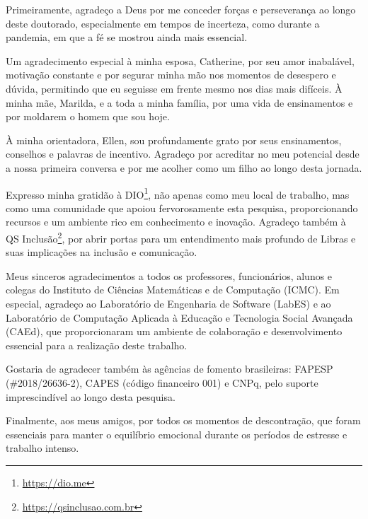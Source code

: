 Primeiramente, agradeço a Deus por me conceder forças e perseverança ao longo deste doutorado, especialmente em tempos de incerteza, como durante a pandemia, em que a fé se mostrou ainda mais essencial.

Um agradecimento especial à minha esposa, Catherine, por seu amor inabalável, motivação constante e por segurar minha mão nos momentos de desespero e dúvida, permitindo que eu seguisse em frente mesmo nos dias mais difíceis. À minha mãe, Marilda, e a toda a minha família, por uma vida de ensinamentos e por moldarem o homem que sou hoje.

À minha orientadora, Ellen, sou profundamente grato por seus ensinamentos, conselhos e palavras de incentivo. Agradeço por acreditar no meu potencial desde a nossa primeira conversa e por me acolher como um filho ao longo desta jornada.

Expresso minha gratidão à DIO\footnote{\url{https://dio.me}}, não apenas como meu local de trabalho, mas como uma comunidade que apoiou fervorosamente esta pesquisa, proporcionando recursos e um ambiente rico em conhecimento e inovação. Agradeço também à QS Inclusão\footnote{\url{https://qsinclusao.com.br}}, por abrir portas para um entendimento mais profundo de Libras e suas implicações na inclusão e comunicação.

Meus sinceros agradecimentos a todos os professores, funcionários, alunos e colegas do Instituto de Ciências Matemáticas e de Computação (ICMC). Em especial, agradeço ao Laboratório de Engenharia de Software (LabES) e ao Laboratório de Computação Aplicada à Educação e Tecnologia Social Avançada (CAEd), que proporcionaram um ambiente de colaboração e desenvolvimento essencial para a realização deste trabalho.

Gostaria de agradecer também às agências de fomento brasileiras: FAPESP (\#2018/26636-2), CAPES (código financeiro 001) e CNPq, pelo suporte imprescindível ao longo desta pesquisa.

Finalmente, aos meus amigos, por todos os momentos de descontração, que foram essenciais para manter o equilíbrio emocional durante os períodos de estresse e trabalho intenso.
